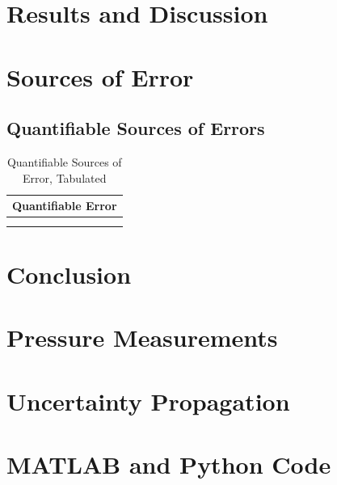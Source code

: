 \documentclass[runningheads]{llncs}
\begin{document}


\section{Results and Discussion}




\section{Sources of Error}\label{sec:source_of_error}

\subsection{Quantifiable Sources of Errors}
\begin{table}[H]
\begin{center}
    \begin{tabular}{ll}
        \toprule
        \multicolumn{2}{c}{Quantifiable Error}\\
        \midrule
         & \\
         & \\
        \bottomrule
\end{tabular}
\end{center}
\caption{Quantifiable Sources of Error, Tabulated}
\label{tab:quant_error}
\end{table}




\section{Conclusion}










\appendix

\section{Pressure Measurements}

\section{Uncertainty Propagation}

\section{MATLAB and Python Code}
\end{document}

